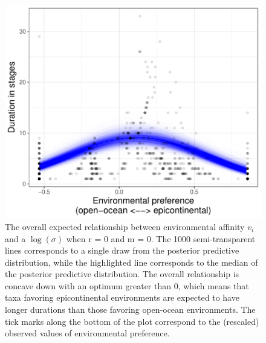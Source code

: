 \documentclass[11pt]{article}
\begin{document}
\begin{figure}[ht]
  \centering
  \includegraphics[height = 0.5\textheight,width=\textwidth,keepaspectratio=true]{figure/env_effect_med_cweib_cens}
  \caption{The overall expected relationship between environmental affinity \(v_{i}\) and a \(\log(\sigma)\) when r = 0 and m = 0. The 1000 semi-transparent lines corresponds to a single draw from the posterior predictive distribution, while the highlighted line corresponds to the median of the posterior predictive distribution. The overall relationship is concave down with an optimum greater than 0, which means that taxa favoring epicontinental environments are expected to have longer durations than those favoring open-ocean environments. The tick marks along the bottom of the plot correspond to the (rescaled) observed values of environmental preference.}
  \label{fig:env_mean}
\end{figure}
\end{document}
